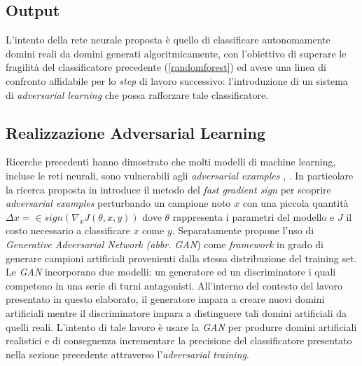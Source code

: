 \subsection{Output}
\label{classificatorennoutput}
L'intento della rete neurale proposta è quello di classificare autonomamente domini reali da domini generati algoritmicamente, con l'obiettivo di superare le fragilità del classificatore precedente (\ref{randomforest}) ed avere una linea di confronto affidabile per lo \textit{step} di lavoro successivo: l'introduzione di un sistema di \textit{adversarial learning} che possa rafforzare tale classificatore. 

\subsection{Realizzazione Adversarial Learning}
\label{adv}
Ricerche precedenti hanno dimostrato che molti modelli di machine learning, incluse le reti neurali, sono vulnerabili agli \textit{adversarial examples} \cite{1312.6199},  \cite{1412.6572}. In particolare la ricerca proposta in \cite{1412.6572} introduce il metodo del \textit{fast gradient sign} per scoprire \textit{adversarial examples} perturbando un campione noto $x$ con una piccola quantità $\Delta x =  \in sign(\nabla_x J(\theta,x,y))$ dove $\theta$ rappresenta i parametri del modello e $J$ il costo necessario a classificare $x$ come $y$.
Separatamente \cite{1406.2661} propone l'uso di \textit{Generative Adversarial Network (abbr. GAN})  come \textit{framework} in grado di generare campioni artificiali provenienti dalla stessa distribuzione del training set.
Le \textit{GAN} incorporano due modelli: un generatore ed un discriminatore i quali competono in una serie di turni antagonisti. All'interno del contesto del lavoro presentato in questo elaborato, il generatore impara a creare nuovi domini artificiali mentre il discriminatore impara a distinguere tali domini artificiali da quelli reali. L'intento di tale lavoro è usare la \textit{GAN} per produrre domini artificiali realistici e di conseguenza incrementare la precisione del classificatore presentato nella sezione precedente attraverso l'\textit{adversarial training}.

